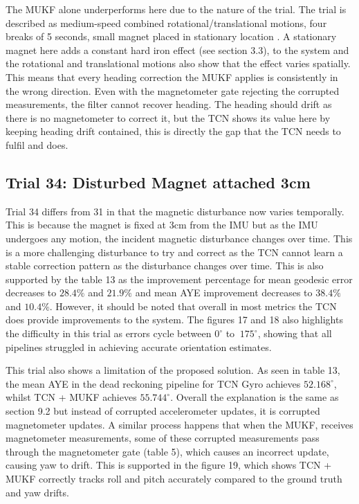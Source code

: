 The MUKF alone underperforms here due to the nature of the trial. The trial is described as medium-speed combined rotational/translational motions, four breaks of 5 seconds, small magnet placed in stationary 
location \cite{laidig_2021_broada}. A stationary magnet here adds a constant hard iron effect (see section 3.3), to the system and the rotational and translational motions also show that the 
effect varies spatially. This means that every heading correction the MUKF applies is consistently in the wrong direction. Even with the magnetometer gate rejecting the corrupted measurements, 
the filter cannot recover heading. The heading should 
drift as there is no magnetometer to correct it, but the TCN shows its value here by keeping heading drift contained, this is directly the gap that the TCN needs to fulfil and does. 



\subsection{Trial 34: Disturbed Magnet attached 3cm}
Trial 34 differs from 31 in that the magnetic disturbance now varies temporally. This is because the magnet is fixed at 3cm from the IMU but as the IMU undergoes any motion, the incident 
magnetic disturbance changes over time. This is a more challenging disturbance to try and correct as the TCN cannot learn a stable correction pattern as the disturbance changes over time. This is also supported
by the table 13 as the improvement percentage for mean geodesic error decreases to $28.4\%$ and $21.9\%$ and mean AYE improvement decreases to $38.4\%$ and $10.4\%$. However, it should be noted that overall
in most metrics the TCN does provide improvements to the system. The figures 17 and 18 also highlights the difficulty in this trial as errors cycle between $0^{\circ}$ to $~175^{\circ}$, showing that all
pipelines struggled in achieving accurate orientation estimates.

This trial also shows a limitation of the proposed solution. As seen in table 13, the mean AYE in the dead reckoning pipeline for TCN Gyro achieves $52.168^{\circ}$, whilst TCN + MUKF achieves $55.744^{\circ}$.
Overall the explanation is the same as section 9.2 but instead of corrupted accelerometer updates, it is corrupted magnetometer updates. A similar process happens that when the MUKF, receives magnetometer
measurements, some of these corrupted measurements pass through the magnetometer gate (table 5), which causes an incorrect update, causing yaw to drift. This is supported in the figure 19, which shows
TCN + MUKF correctly tracks roll and pitch accurately compared to the ground truth and yaw drifts.

